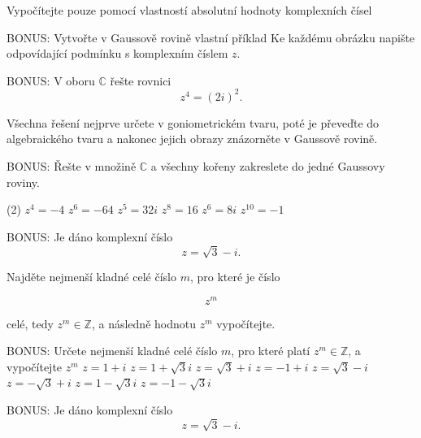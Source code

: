 \begin{exerciseblock}[2]{Vypočítejte pouze pomocí vlastností absolutní hodnoty komplexních čísel}
\begin{exercise}{BONUS: Vytvořte v Gaussově rovině vlastní příklad}
    Ke každému obrázku napište odpovídající podmínku s komplexním číslem $z$.
\end{exercise}



\begin{exercise}{BONUS: V oboru $\mathbb{C}$ řešte rovnici
\[
    z^4=(2i)^2.
\]

Všechna řešení nejprve určete v goniometrickém tvaru, poté je převeďte
do algebraického tvaru a nakonec jejich obrazy znázorněte v Gaussově rovině.
}
\end{exercise}


\begin{exercise}{BONUS: Řešte v množině $\mathbb{C}$ a všechny kořeny zakreslete do jedné Gaussovy roviny.}
    \begin{tasks}(2)
        \task $z^4=-4$
        \task $z^6=-64$
        \task $z^5=32i$
        \task $z^8=16$
        \task $z^6=8i$
        \task $z^{10}=-1$
    \end{tasks}
\end{exercise}



\begin{exercise}{BONUS: Je dáno komplexní číslo
\[
    z=\sqrt3-i.
\]

Najděte nejmenší kladné celé číslo $m$, pro které je číslo

\[
    z^m
\]

celé, tedy $z^m\in\mathbb{Z}$, a následně hodnotu $z^m$ vypočítejte.
}
\end{exercise}


\begin{exerciseblock}[2]{BONUS: Určete nejmenší kladné celé číslo $m$, pro které platí $z^m\in\mathbb{Z}$, a vypočítejte $z^m$}
    \task $z=1+i$
    \task $z=1+\sqrt3 i$
    \task $z=\sqrt3+i$
    \task $z=-1+i$
    \task $z=\sqrt3-i$
    \task $z=-\sqrt3+i$
    \task $z=1-\sqrt3 i$
    \task $z=-1-\sqrt3 i$
\end{exerciseblock}



\begin{exercise}{BONUS: Je dáno komplexní číslo
\[
    z=\sqrt3-i.
\]

}
\end{exercise}
\end{exerciseblock}
